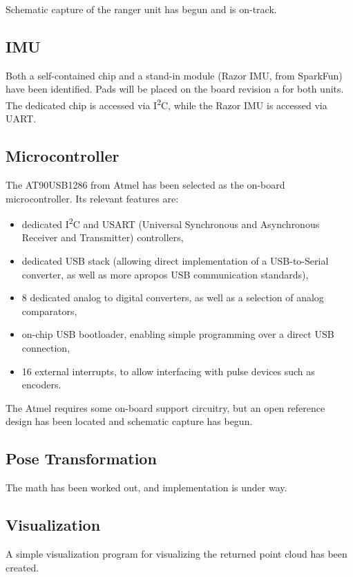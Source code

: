\documentclass{article}
\begin{document}
Schematic capture of the ranger unit has begun and is on-track.

\subsection{IMU}
Both a self-contained chip and a stand-in module (Razor IMU, from SparkFun) have
been identified.  Pads will be placed on the board revision a for both units.
The dedicated chip is accessed via I\textsuperscript{2}C, while the Razor IMU is
accessed via UART.

\subsection{Microcontroller}
The AT90USB1286 from Atmel has been selected as the on-board microcontroller.
Its relevant features are:
\begin{itemize}
\item dedicated I\textsuperscript{2}C and USART (Universal
Synchronous and Asynchronous Receiver and Transmitter) controllers,
\item dedicated USB stack (allowing direct implementation of a USB-to-Serial
  converter, as well as more apropos USB communication standards),
\item 8 dedicated analog to digital converters, as well as a selection of analog
  comparators,
\item on-chip USB bootloader, enabling simple programming over a direct USB
  connection,
\item 16 external interrupts, to allow interfacing with pulse devices such as
  encoders.
\end{itemize}
The Atmel requires some on-board support circuitry, but an open reference design
has been located and schematic capture has begun.

\subsection{Pose Transformation}
The math has been worked out, and implementation is under way.

\subsection{Visualization}
A simple visualization program for visualizing the returned point cloud has been
created.
\end{document}
